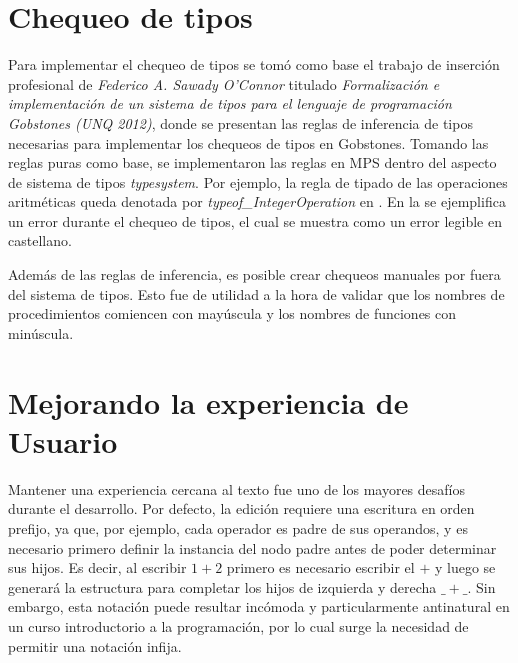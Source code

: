 

\section{Chequeo de tipos}\label{chequeo}

Para implementar el chequeo de tipos se tomó como base el trabajo de inserción profesional de \textit{Federico A. Sawady O’Connor} titulado \textit{Formalización e implementación de un sistema de tipos para el lenguaje de programación Gobstones (UNQ 2012)}, donde se presentan las reglas de inferencia de tipos necesarias para implementar los chequeos de tipos en Gobstones. 
Tomando las reglas puras como base, se implementaron las reglas en MPS dentro del aspecto de sistema de tipos \textit{typesystem}. Por ejemplo, la regla de tipado de las operaciones aritméticas queda denotada por \textit{typeof\_IntegerOperation} en .
En la  se ejemplifica un error durante el chequeo de tipos, el cual se muestra como un error legible en castellano.


Además de las reglas de inferencia, es posible crear chequeos manuales por fuera del sistema de tipos. Esto fue de utilidad a la hora de validar que los nombres de procedimientos comiencen con mayúscula y los nombres de funciones con minúscula.

\bigskip
\section{Mejorando la experiencia de Usuario}\label{usabilidad}

Mantener una experiencia cercana al texto fue uno de los mayores desafíos durante el desarrollo. Por defecto, la edición requiere una escritura en orden prefijo, ya que, por ejemplo, cada operador es padre de sus operandos, y es necesario primero definir la instancia del nodo padre antes de poder determinar sus hijos.
Es decir, al escribir $1+2$ primero es necesario escribir el $+$ y luego se generará la estructura para completar los hijos de izquierda y derecha $\_ + \_$. Sin embargo, esta notación puede resultar incómoda y particularmente antinatural en un curso introductorio a la programación, por lo cual surge la necesidad de permitir una notación infija.

